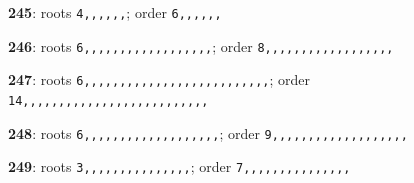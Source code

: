 \noindent \textbf{245}: roots \texttt{4,,,,,,}; order \texttt{6,,,,,,}\par
\noindent \textbf{246}: roots \texttt{6,,,,,,,,,,,,,,,,,,}; order \texttt{8,,,,,,,,,,,,,,,,,,}\par
\noindent \textbf{247}: roots \texttt{6,,,,,,,,,,,,,,,,,,,,,,,,,,}; order \texttt{14,,,,,,,,,,,,,,,,,,,,,,,,,,}\par
\noindent \textbf{248}: roots \texttt{6,,,,,,,,,,,,,,,,,,,}; order \texttt{9,,,,,,,,,,,,,,,,,,,}\par
\noindent \textbf{249}: roots \texttt{3,,,,,,,,,,,,,,,}; order \texttt{7,,,,,,,,,,,,,,,}\par
